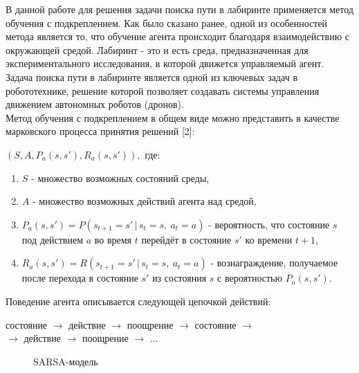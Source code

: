 \documentclass[a4paper]{report}
\theoremstyle{definition}
\theoremstyle{plain}
\theoremstyle{remark}
\theoremstyle{remark}
\theoremstyle{definition}
\begin{document}
В данной работе для решения задачи поиска пути в лабиринте применяется метод обучения с подкреплением. Как было сказано ранее, одной из особенностей метода является то, что обучение агента происходит благодаря взаимодействию с окружающей средой. Лабиринт - это и есть среда, предназначенная для экспериментального исследования, в которой движется управляемый агент. Задача поиска пути в лабиринте является одной из ключевых задач в робототехнике, решение которой позволяет создавать системы управления движением автономных роботов (дронов). \\

Метод обучения с подкреплением в общем виде можно представить в качестве марковского процесса принятия решений [2]:
\begin{center}
	 $ (S, A, P_a(s, s'), R_a(s, s')),$ где:
\end{center}
\begin{enumerate}
 	\item $S$ - множество возможных состояний среды,
 	\item $A$ - множество возможных действий агента над средой,
 	\item $P_a(s, s') = P(s_{t+1}=s'\,|\,s_t=s,\:a_t=a)$ - вероятность, что состояние $s$ под действием $a$ во время $t$ перейдёт в состояние $s'$ ко времени $t+1$,
 	\item $R_a(s, s') = R(s_{t+1}=s'\,|\,s_t=s,\:a_t=a)$ - вознаграждение, получаемое после перехода в состояние $s'$ из состояния $s$ с вероятностью $P_a(s,s')$.
\end{enumerate}


Поведение агента описывается следующей цепочкой действий:
\begin{center}
состояние $\rightarrow$ действие
$\rightarrow$ поощрение $\rightarrow$ состояние $\rightarrow$ \\
$\rightarrow$ действие $\rightarrow$ поощрение $\rightarrow$ ... 
\end{center}

\begin{figure}[h]
	\caption{\normalsize{SARSA-модель}}
\end{figure}
\end{document}
